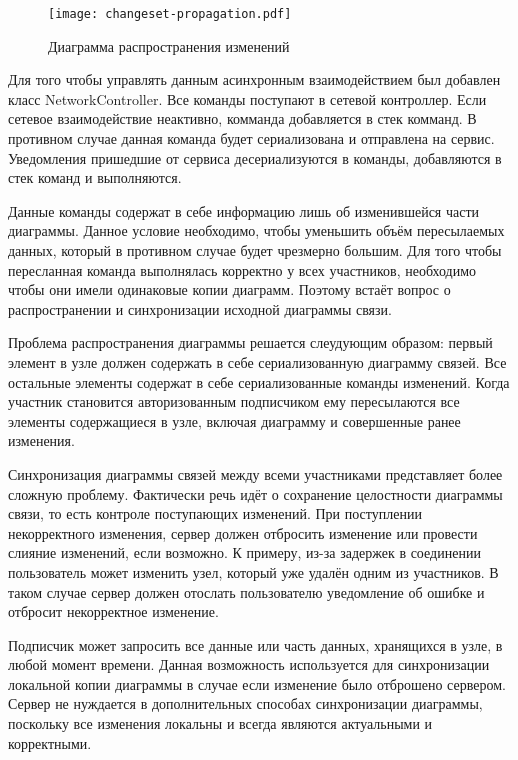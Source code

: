 \begin{figure}
  \centering
  \texttt{[image: changeset-propagation.pdf]}
  \caption{Диаграмма распространения изменений}
  \label{img:changeset_propagation}
\end{figure}

Для того чтобы управлять данным асинхронным взаимодействием был добавлен класс
NetworkController. Все команды поступают в сетевой контроллер. Если сетевое
взаимодействие неактивно, комманда добавляется в стек комманд. В противном
случае данная команда будет сериализована и отправлена на сервис. Уведомления
пришедшие от сервиса десериализуются в команды, добавляются в стек команд и
выполняются.

Данные команды содержат в себе информацию лишь об изменившейся части диаграммы.
Данное условие необходимо, чтобы уменьшить объём пересылаемых данных, который в
противном случае будет чрезмерно большим. Для того чтобы пересланная команда
выполнялась корректно у всех участников, необходимо чтобы они имели одинаковые
копии диаграмм. Поэтому встаёт вопрос о распространении и синхронизации
исходной диаграммы связи.

Проблема распространения диаграммы решается слеудующим образом: первый элемент в
узле должен содержать в себе сериализованную диаграмму связей. Все остальные
элементы содержат в себе сериализованные команды изменений. Когда участник
становится авторизованным подписчиком ему пересылаются все элементы содержащиеся
в узле, включая диаграмму и совершенные ранее изменения.

Синхронизация диаграммы связей между всеми участниками представляет более
сложную проблему. Фактически речь идёт о сохранение целостности диаграммы связи,
то есть контроле поступающих изменений. При поступлении некорректного изменения,
сервер должен отбросить изменение или провести слияние изменений, если возможно.
К примеру, из-за задержек в соединении пользователь может изменить узел, который
уже удалён одним из участников. В таком случае сервер должен отослать
пользователю уведомление об ошибке и отбросит некорректное изменение.

Подписчик может запросить все данные или часть данных, хранящихся в узле, в
любой момент времени. Данная возможность используется для синхронизации
локальной копии диаграммы в случае если изменение было отброшено сервером.
Сервер не нуждается в дополнительных способах синхронизации диаграммы, поскольку
все изменения локальны и всегда являются актуальными и корректными.

